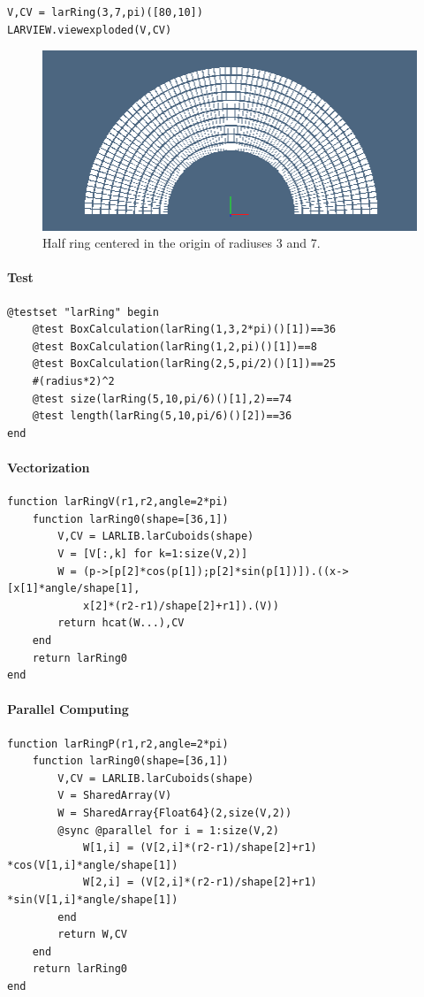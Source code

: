 \documentclass{article}
\begin{document}
\begin{verbatim}
V,CV = larRing(3,7,pi)([80,10])
LARVIEW.viewexploded(V,CV)
\end{verbatim}
\begin{figure}[htbp] 
\centering 
\includegraphics[scale=.5]{larRing2.png} 
\caption{Half ring centered in the origin of radiuses 3 and 7.} 
\end{figure}

\paragraph{Test}

\begin{Verbatim}
@testset "larRing" begin
	@test BoxCalculation(larRing(1,3,2*pi)()[1])==36
	@test BoxCalculation(larRing(1,2,pi)()[1])==8
	@test BoxCalculation(larRing(2,5,pi/2)()[1])==25
	#(radius*2)^2
	@test size(larRing(5,10,pi/6)()[1],2)==74
	@test length(larRing(5,10,pi/6)()[2])==36
end
\end{Verbatim}

\paragraph{Vectorization}

\begin{verbatim}
function larRingV(r1,r2,angle=2*pi)
    function larRing0(shape=[36,1])
        V,CV = LARLIB.larCuboids(shape)
        V = [V[:,k] for k=1:size(V,2)]
        W = (p->[p[2]*cos(p[1]);p[2]*sin(p[1])]).((x->[x[1]*angle/shape[1], 
            x[2]*(r2-r1)/shape[2]+r1]).(V))
        return hcat(W...),CV
    end
    return larRing0
end
\end{verbatim}

\paragraph{Parallel Computing}
\begin{Verbatim}
function larRingP(r1,r2,angle=2*pi)
    function larRing0(shape=[36,1])
        V,CV = LARLIB.larCuboids(shape)
        V = SharedArray(V)
        W = SharedArray{Float64}(2,size(V,2))
        @sync @parallel for i = 1:size(V,2)
            W[1,i] = (V[2,i]*(r2-r1)/shape[2]+r1) *cos(V[1,i]*angle/shape[1])
            W[2,i] = (V[2,i]*(r2-r1)/shape[2]+r1) *sin(V[1,i]*angle/shape[1])
        end
        return W,CV
    end
    return larRing0
end
\end{Verbatim}
\end{document}
